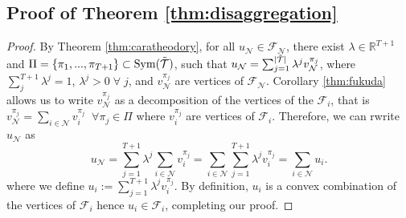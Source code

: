 \subsection{Proof of Theorem \ref{thm:disaggregation}}
\begin{proof}
    By Theorem \ref{thm:caratheodory}, for all $u_\mathcal{N} \in \mathcal{F}_\mathcal{N}$, there exist $\lambda \in \mathbb{R}^{T + 1}$ and $\Pi = \{\pi_1, ..., \pi_{T+1}\} \subset \mathrm{Sym}(\Tilde{\mathcal{T}})$, such that $
        u_\mathcal{N} = \sum_{j=1}^{|\Tilde{\mathcal{T}}|} \lambda^j v_\mathcal{N}^{\pi_j}$,
    where $\sum_j^{T+1}\lambda^j = 1$, $\lambda^j > 0 \; \forall \;j$, and  $v_\mathcal{N}^{\pi_j}$ are vertices of $\mathcal{F}_\mathcal{N}$.
    Corollary \ref{thm:fukuda} allows us to write $ v_\mathcal{N}^{\pi_j}$ as a decomposition of the vertices of the $\mathcal{F}_i$, that is $v_\mathcal{N}^{\pi_j} = \sum_{i\in \mathcal{N}} v_i^{\pi_j} \;\;\forall \pi_j \in \Pi$  where $v_i^{\pi_j}$ are vertices of $\mathcal{F}_i$. Therefore, we can rwrite $u_\mathcal{N}$ as
    \begin{equation*}
        u_\mathcal{N} = \sum_{j=1}^{T+1} \lambda^j \sum_{i\in \mathcal{N}} v_i^{\pi_j} = \sum_{i\in \mathcal{N}} \sum_{j=1}^{T+1} \lambda^j v_i^{\pi_j} = \sum_{i\in \mathcal{N}} u_i.
    \end{equation*}
     where we define $u_i := \sum_{j=1}^{T+1} \lambda^j v_i^{\pi_j}$. By definition, $u_i$ is a convex combination of the vertices of $\mathcal{F}_i$ hence $u_i \in \mathcal{F}_i$, completing our proof.
\end{proof}




